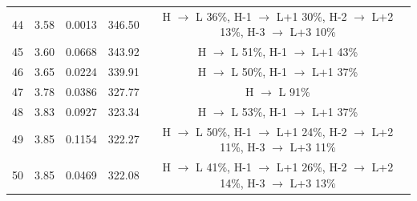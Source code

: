 \begin{table}[H]
{\begin{center}
\begin{tabular}{ccccc}
44 & 3.58 & 0.0013 & 346.50 & H $\rightarrow$ L 36\%, H-1 $\rightarrow$ L+1 30\%, H-2 $\rightarrow$ L+2 13\%, H-3 $\rightarrow$ L+3 10\% \\
45 & 3.60 & 0.0668 & 343.92 & H $\rightarrow$ L 51\%, H-1 $\rightarrow$ L+1 43\% \\
46 & 3.65 & 0.0224 & 339.91 & H $\rightarrow$ L 50\%, H-1 $\rightarrow$ L+1 37\% \\
47 & 3.78 & 0.0386 & 327.77 & H $\rightarrow$ L 91\% \\
48 & 3.83 & 0.0927 & 323.34 & H $\rightarrow$ L 53\%, H-1 $\rightarrow$ L+1 37\% \\
49 & 3.85 & 0.1154 & 322.27 & H $\rightarrow$ L 50\%, H-1 $\rightarrow$ L+1 24\%, H-2 $\rightarrow$ L+2 11\%, H-3 $\rightarrow$ L+3 11\% \\
50 & 3.85 & 0.0469 & 322.08 & H $\rightarrow$ L 41\%, H-1 $\rightarrow$ L+1 26\%, H-2 $\rightarrow$ L+2 14\%, H-3 $\rightarrow$ L+3 13\% \\
\hline
\end{tabular}
\end{center} }
\vspace{-0.2cm}
\end{table} \newpage \noindent

